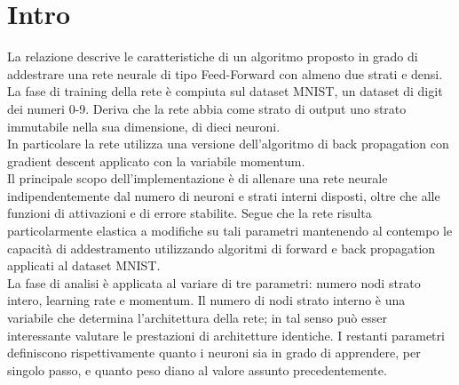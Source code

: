 \chapter{Intro}
La relazione descrive le caratteristiche di un algoritmo proposto in grado di addestrare una rete neurale di tipo Feed-Forward con almeno due strati e densi. La fase di training della rete è compiuta sul dataset MNIST, un dataset di digit dei numeri 0-9. Deriva che la rete abbia come strato di output uno strato immutabile nella sua dimensione, di dieci neuroni. \\
In particolare la rete utilizza una versione dell'algoritmo di back propagation con gradient descent applicato con la variabile momentum.\\
Il principale scopo dell'implementazione è di allenare una rete neurale indipendentemente dal numero di neuroni e strati interni disposti, oltre che alle funzioni di attivazioni e di errore stabilite. Segue che la rete risulta particolarmente elastica a modifiche su tali parametri mantenendo al contempo le capacità di addestramento utilizzando algoritmi di forward e back propagation applicati al dataset MNIST. \\
La fase di analisi è applicata al variare di tre parametri: numero nodi strato intero, learning rate e momentum. Il numero di nodi strato interno è una variabile che determina l'architettura della rete; in tal senso può esser interessante valutare le prestazioni di architetture identiche. I restanti parametri definiscono rispettivamente quanto i neuroni sia in grado di apprendere, per singolo passo, e quanto peso diano al valore assunto precedentemente. 